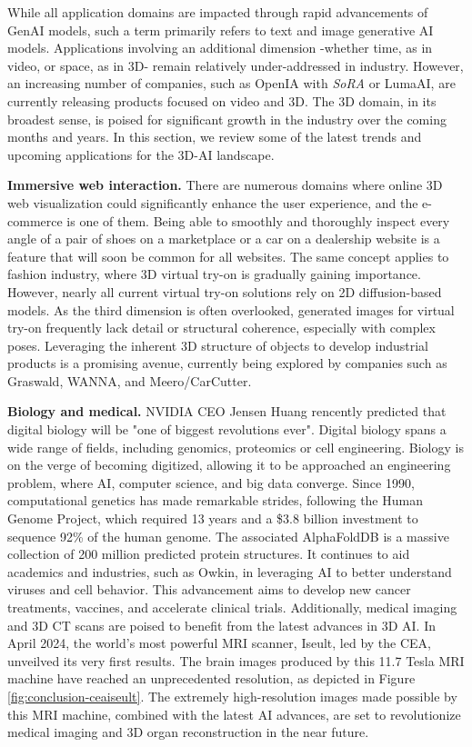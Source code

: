 While all application domains are impacted through rapid advancements of \ac{GenAI} models, such a term primarily refers to text and image generative \ac{AI} models. Applications involving an additional dimension -whether time, as in video, or space, as in 3D- remain relatively under-addressed in industry. However, an increasing number of companies, such as OpenIA with \textit{SoRA} or LumaAI, are currently releasing products focused on video and 3D. The 3D domain, in its broadest sense, is poised for significant growth in the industry over the coming months and years. In this section, we review some of the latest trends and upcoming applications for the 3D-\ac{AI} landscape. 

\noindent \textbf{Immersive web interaction.} There are numerous domains where online 3D web visualization could significantly enhance the user experience, and the e-commerce is one of them. Being able to smoothly and thoroughly inspect every angle of a pair of shoes on a marketplace or a car on a dealership website is a feature that will soon be common for all websites. The same concept applies to fashion industry, where 3D virtual try-on is gradually gaining importance. However, nearly all current virtual try-on solutions rely on 2D diffusion-based models. As the third dimension is often overlooked, generated images for virtual try-on frequently lack detail or structural coherence, especially with complex poses. Leveraging the inherent 3D structure of objects to develop industrial products is a promising avenue, currently being explored by companies such as Graswald, WANNA, and Meero/CarCutter. 

\noindent \textbf{Biology and medical.} NVIDIA CEO Jensen Huang rencently predicted that digital biology will be "one of biggest revolutions ever". Digital biology spans a wide range of fields, including genomics, proteomics or cell engineering. Biology is on the verge of becoming digitized, allowing it to be approached an engineering problem, where \ac{AI}, computer science, and big data converge. Since 1990, computational genetics has made remarkable strides, following the Human Genome Project, which required 13 years and a \$3.8 billion investment to sequence 92\% of the human genome. The associated AlphaFoldDB is a massive collection of 200 million predicted protein structures. It continues to aid academics and industries, such as Owkin, in leveraging \ac{AI} to better understand viruses and cell behavior. This advancement aims to develop new cancer treatments, vaccines, and accelerate clinical trials. Additionally, medical imaging and 3D CT scans are poised to benefit from the latest advances in 3D \ac{AI}. In April 2024, the world's most powerful \ac{MRI} scanner, Iseult, led by the CEA, unveilved its very first results. The brain images produced by this 11.7 Tesla \ac{MRI} machine have reached an unprecedented resolution, as depicted in Figure \ref{fig:conclusion-ceaiseult}. The extremely high-resolution images made possible by this MRI machine, combined with the latest \ac{AI} advances, are set to revolutionize medical imaging and 3D organ reconstruction in the near future.

